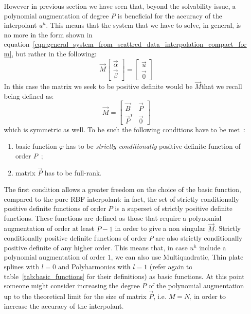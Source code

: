However in previous section we have seen that, beyond the solvability issue, a polynomial augmentation of degree $P$ is beneficial for the accuracy of the interpolant $u^h$. This means that the system that we have to solve, in general, is no more in the form shown in equation~\eqref{eqn:general_system_from_scattred_data_interpolation_compact_form}, but rather in the following:
\begin{equation}
\label{eqn:general_system_from_scattred_data_interpolation_poly_augmentation_compact_form}
\vec{M}
\begin{bmatrix}
	\vec{\alpha}  \\  \vec{\beta}
\end{bmatrix} = 
\begin{bmatrix}
	\vec{u}  \\  \vec{0}
\end{bmatrix}
\end{equation}
In this case the matrix we seek to be positive definite would be $\vec{M}$that we recall being defined as:
\begin{equation}
\label{eqn:global_M_definition}
\vec{M} =
\begin{bmatrix}
	\vec{B}    &  \vec{P}  \\
	\vec{P}^T  &  \vec{0}
\end{bmatrix}
\end{equation}
which is symmetric as well. 
To be such the following conditions have to be met~\cite{Miotti:phd_thesis}:
\begin{enumerate}
	\item basic function $\varphi$ has to be \emph{strictly conditionally} positive definite function of order $P$~\cite{Fasshauer:details_on_basic_functions};  \label{enum:condition_on_basic_functions_for_solvability}
	\item matrix $\vec{P}$ has to be full-rank.  \label{enum:condition_on_P_for_solvability}
\end{enumerate}
The first condition allows a greater freedom on the choice of the basic function, compared to the pure RBF interpolant: in fact, the set of strictly conditionally positive definite functions of order $P$ is a superset of strictly positive definite functions. These functions are defined as those that require a polynomial augmentation of order at least $P-1$ in order to give a non singular $\vec{M}$. Strictly conditionally positive definite functions of order $P$ are also strictly conditionally positive definite of any higher order. This means that, in case $u^h$ include a polynomial augmentation of order $1$, we can also use Multiquadratic, Thin plate splines with $l=0$ and Polyharmonics with $l=1$ (refer again to table~\ref{tab:basic_functions} for their definitions) as basic functions. At this point someone might consider increasing the degree $P$ of the polynomial augmentation up to the theoretical limit for the size of matrix $\vec{P}$, i.e. $M=N$, in order to increase the accuracy of the interpolant. %
